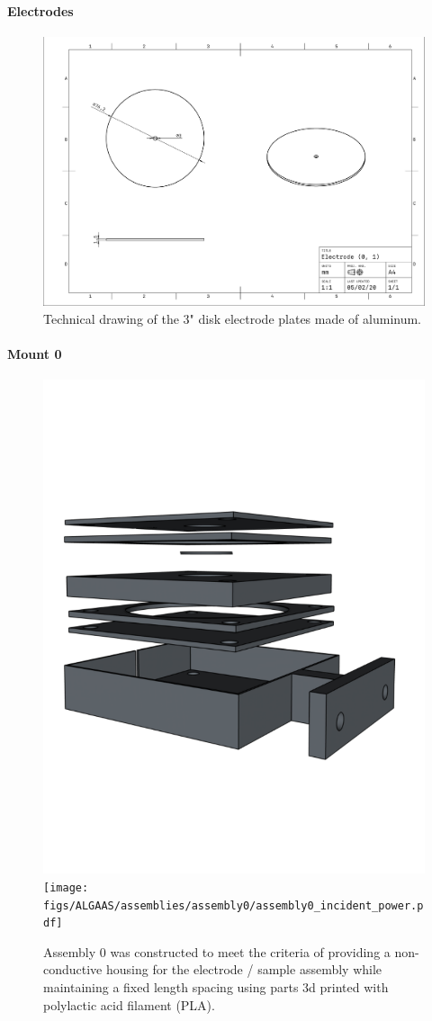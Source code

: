 \paragraph*{Electrodes}
\begin{figure}[H]
  \centering
  \includegraphics[width=\textwidth]{figs/ALGAAS/assemblies/assembly0/Electrode_0_1.pdf}
  \caption{Technical drawing of the 3" disk electrode plates made of aluminum.}
\end{figure}


\paragraph*{Mount 0}

\begin{figure}[!ht]
	\begin{subcaptiongroup}
		\centering
		\includegraphics[width=.42\textwidth]{figs/ALGAAS/assemblies/assembly0/assembly0.pdf}
		\label{A0}
		\texttt{[image: figs/ALGAAS/assemblies/assembly0/assembly0\_incident\_power.pdf]}
 		\label{A0inc}
	\end{subcaptiongroup}
  \caption{Assembly 0 was constructed to meet the criteria of providing a non-conductive housing for the electrode / sample assembly while maintaining a fixed length spacing using parts 3d printed with polylactic acid filament (PLA).}
  \label{fig:assembly0bp}
\end{figure}
\FloatBarrier

